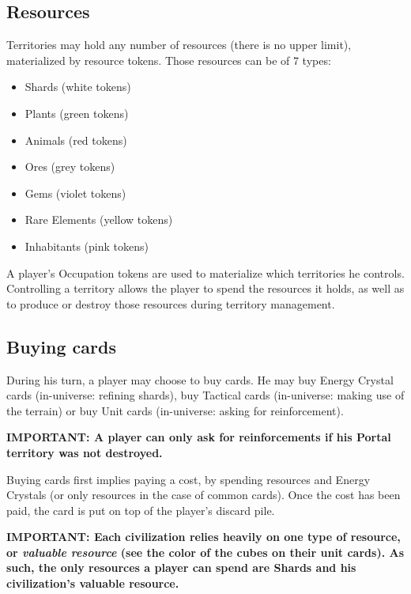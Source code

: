 \documentclass[a4paper]{article}
\begin{document}
\newpage
  \subsection{Resources}
  
    Territories may hold any number of resources (there is no upper limit),
    materialized by resource tokens. Those resources can be of 7 types:
    
    \vspace{-1.3em}
    \begin{itemize}
        \item Shards (white tokens)
        \item Plants (green tokens)
        \item Animals (red tokens)
        \item Ores (grey tokens)
        \item Gems (violet tokens)
        \item Rare Elements (yellow tokens)
        \item Inhabitants (pink tokens)
    \end{itemize}
    
    \vspace{-0.7em}
    A player's Occupation tokens are used to materialize which territories he controls.
    Controlling a territory allows the player to spend the resources it holds,
    as well as to produce or destroy those resources during territory management.
  
  
  \subsection{Buying cards}

    During his turn, a player may choose to buy cards.
    He may buy Energy Crystal cards (in-universe: refining shards),
    buy Tactical cards (in-universe: making use of the terrain)
    or buy Unit cards (in-universe: asking for reinforcement).
    
    \hspace{-1.5em} \textbf{IMPORTANT:
    A player can only ask for reinforcements if his Portal territory was not destroyed.
    }
    
    Buying cards first implies paying a cost, by spending resources and Energy Crystals
    (or only resources in the case of common cards).
    Once the cost has been paid, the card is put on top of the player's discard pile.
    
    \hspace{-1.5em} \textbf{IMPORTANT:
    Each civilization relies heavily on one type of resource, or \textit{valuable resource}
    (see the color of the cubes on their unit cards).
    As such, the only resources a player can spend are Shards and his civilization's
    valuable resource.
    }
\end{document}
